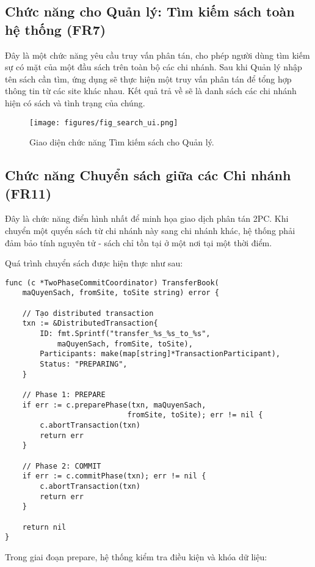 \documentclass[conference]{IEEEtran}
\begin{document}
\subsection{Chức năng cho Quản lý: Tìm kiếm sách toàn hệ thống (FR7)}
Đây là một chức năng yêu cầu truy vấn phân tán, cho phép người dùng tìm kiếm sự có mặt của một đầu sách trên toàn bộ các chi nhánh. Sau khi Quản lý nhập tên sách cần tìm, ứng dụng sẽ thực hiện một truy vấn phân tán để tổng hợp thông tin từ các site khác nhau. Kết quả trả về sẽ là danh sách các chi nhánh hiện có sách và tình trạng của chúng.

\begin{figure}[!h]
\centering
\texttt{[image: figures/fig\_search\_ui.png]} 
\caption{Giao diện chức năng Tìm kiếm sách cho Quản lý.}
\label{fig_search_ui}
\end{figure}

\subsection{Chức năng Chuyển sách giữa các Chi nhánh (FR11)}
Đây là chức năng điển hình nhất để minh họa giao dịch phân tán 2PC. Khi chuyển một quyển sách từ chi nhánh này sang chi nhánh khác, hệ thống phải đảm bảo tính nguyên tử - sách chỉ tồn tại ở một nơi tại một thời điểm.

Quá trình chuyển sách được hiện thực như sau:

\begin{Verbatim}[fontsize=\footnotesize,breaklines=true,breakanywhere=true]
func (c *TwoPhaseCommitCoordinator) TransferBook(
    maQuyenSach, fromSite, toSite string) error {
    
    // Tạo distributed transaction
    txn := &DistributedTransaction{
        ID: fmt.Sprintf("transfer_%s_%s_to_%s", 
            maQuyenSach, fromSite, toSite),
        Participants: make(map[string]*TransactionParticipant),
        Status: "PREPARING",
    }
    
    // Phase 1: PREPARE
    if err := c.preparePhase(txn, maQuyenSach, 
                            fromSite, toSite); err != nil {
        c.abortTransaction(txn)
        return err
    }
    
    // Phase 2: COMMIT
    if err := c.commitPhase(txn); err != nil {
        c.abortTransaction(txn)
        return err
    }
    
    return nil
}
\end{Verbatim}

Trong giai đoạn prepare, hệ thống kiểm tra điều kiện và khóa dữ liệu:
\end{document}
